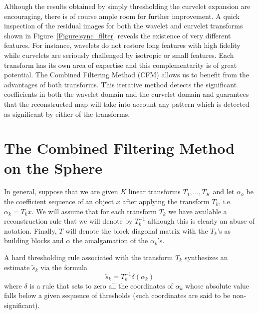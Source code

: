 Although the results obtained by simply thresholding the curvelet expansion are encouraging, there is of course ample room for further
improvement. A quick inspection of the residual images for both the wavelet and curvelet transforms shown in Figure~\ref{Figure:sync_filter}
reveals the existence of very different features. For instance, wavelets do not restore long features with high fidelity while curvelets
are seriously challenged by isotropic or small features. Each transform has its own area of expertise and this complementarity is of great 
potential. The Combined Filtering Method (CFM) \citep{starck:spie01a} allows us to benefit from the advantages of both transforms. This iterative 
method detects the significant coefficients in both the wavelet domain and the curvelet domain and guarantees that the reconstructed map will 
take into account any pattern which is detected as significant by either of the transforms. 

\section{The Combined Filtering Method on the Sphere}


In general, suppose that we are given $K$ linear transforms $T_1,
\ldots, T_K$ and let $\alpha_k$ be the coefficient sequence of an
object $x$ after applying the transform $T_k$, i.e. $\alpha_k = T_k
x$. We will assume that for each transform $T_k$ we have available a
reconstruction rule that we will denote by $T^{-1}_k$ although this is
clearly an abuse of notation.  Finally, $T$ will denote the block
diagonal matrix with the $T_k$'s as building blocks and $\alpha$ the
amalgamation of the $\alpha_k$'s.

A hard thresholding rule associated with the transform $T_k$ synthesizes 
an estimate $\tilde{s}_k$ via the formula 
\begin{equation}
\label{eq:ht}
\tilde{s}_k = T_k^{-1} \delta(\alpha_k)
\end{equation}
where $\delta$ is a rule that sets to zero all the coordinates of
$\alpha_k$ whose absolute value falls below a given sequence of
thresholds (such coordinates are said to be non-significant).\\
 
